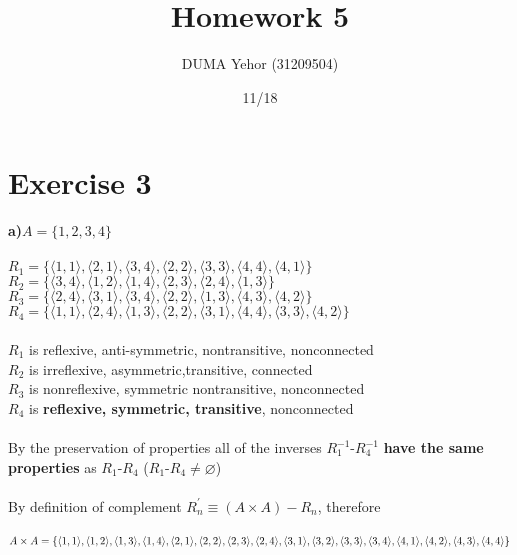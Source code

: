 \documentclass{article}
\title{Homework 5}
\author{DUMA Yehor (31209504)}
\date{11/18}
\begin{document}
\maketitle

\section{Exercise 3}
\textbf{a)}$A =\{1,2,3,4\}$\\ \\
$R_1 = \{\langle 1,1 \rangle, \langle 2,1 \rangle, \langle 3,4 \rangle, \langle 2,2 \rangle, \langle 3,3 \rangle, \langle 4,4\rangle,\langle 4,1 \rangle\}$ \\
$R_2 = \{\langle 3,4 \rangle, \langle 1,2 \rangle, \langle 1,4 \rangle, \langle 2,3 \rangle, \langle 2,4 \rangle, \langle 1,3\rangle\}$ \\
$R_3 = \{\langle 2,4 \rangle, \langle 3,1 \rangle, \langle 3,4 \rangle, \langle 2,2 \rangle, \langle 1,3 \rangle, \langle 4,3\rangle,\langle 4,2 \rangle\}$ \\
$R_4 = \{\langle 1,1 \rangle, \langle 2,4 \rangle, \langle 1,3 \rangle, \langle 2,2 \rangle, \langle 3,1 \rangle, \langle 4,4\rangle , \langle 3,3\rangle, \langle 4,2\rangle\}$ \\ \\
$R_1$ is reflexive, anti-symmetric, nontransitive, nonconnected \\
$R_2$ is irreflexive, asymmetric,transitive, connected \\
$R_3$ is nonreflexive, symmetric nontransitive, nonconnected \\
$R_4$ is \textbf{reflexive, symmetric, transitive}, nonconnected \\ \\
By the preservation of properties all of the inverses $R^{-1}_{1}$-$R^{-1}_{4}$ \textbf{have the same properties} as $R_1$-$R_4$ ($R_1$-$R_4 \neq \varnothing$) \\ \\ 
By definition of complement $R^{'}_{n} \equiv (A \times A) - R_n$, therefore \\ \\ 
$A \times A = \{ \\ \langle 1,1 \rangle, \langle 1,2 \rangle, \langle 1,3 \rangle, \langle 1,4 \rangle, \\ \langle 2,1 \rangle, \langle 2,2\rangle,\langle 2,3 \rangle , \langle 2,4 \rangle, \\ \langle 3,1 \rangle, \langle 3,2 \rangle, \langle 3,3 \rangle, \langle 3,4 \rangle, \\ \langle 4,1 \rangle,\langle 4,2 \rangle,\langle 4,3 \rangle,\langle 4,4 \rangle \}$ \\ \\ 
\end{document}
